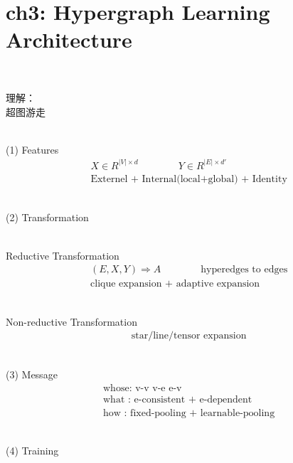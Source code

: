 \documentclass{article}
\begin{document}
\newpage
\section*{ch3: Hypergraph Learning Architecture}


~ \\[3pt]
\begin{CJK}{UTF8}{gbsn}
    理解： \\[3pt]
        超图游走  \\[3pt]
\end{CJK}


~ \\[3pt]
(1) Features
\begin{align*}
    & X \in R^{ |V| \times d } \qquad \qquad Y \in R^{ |E| \times d'} \\[3pt]
    & \text{Externel + Internal(local+global) + Identity}
\end{align*}


~ \\[3pt]
(2) Transformation

~ \\[3pt]
Reductive Transformation
\begin{align*}
    & ( E, X, Y ) \Rightarrow A 
    \qquad \qquad 
    \text{hyperedges to edges} \\[3pt]
    & \text{clique expansion + adaptive expansion}
\end{align*}

~ \\[3pt]
Non-reductive Transformation
\begin{align*}
    & \text{star/line/tensor expansion}
\end{align*}


~ \\[3pt]
(3) Message
\begin{align*}
    & \text{whose: v-v \ v-e \ e-v} \\[3pt]
    & \text{what : e-consistent + e-dependent} \\[3pt]
    & \text{how  : fixed-pooling + learnable-pooling} 
\end{align*}


~ \\[3pt]
(4) Training
\end{document}

